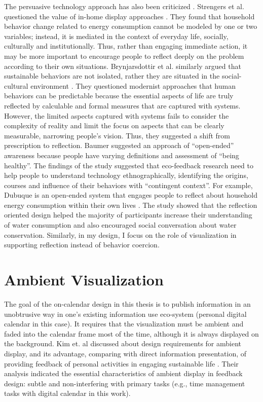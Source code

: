 \documentclass[12pt,oneside]{book}
\begin{document}
The persuasive technology approach has also been criticized \cite{brynjarsdottir_sustainably_2012, strengers_peak_2012,yetim_critical_2013}. Strengers et al. questioned the value of in-home display approaches \cite{strengers_peak_2012}.  They found that household behavior change related to energy consumption cannot be modeled by one or two variables; instead, it is mediated in the context of everyday life, socially, culturally and institutionally. Thus, rather than engaging immediate action, it may be more important to encourage people to reflect deeply on the problem according to their own situations.  Brynjarsdottir et al. similarly argued that sustainable behaviors are not isolated, rather they are situated in the social-cultural environment \cite{brynjarsdottir_sustainably_2012}.  They questioned modernist approaches that human behaviors can be predictable because the essential aspects of life are truly reflected by calculable and formal measures that are captured with systems.  However, the limited aspects captured with systems fails to consider the complexity of reality and limit the focus on aspects that can be clearly measurable, narrowing people's vision.  Thus, they suggested a shift from prescription to reflection.  Baumer \cite{baumer_prescriptive_2012} suggested an approach of ``open-ended'' awareness because people have varying definitions and assessment of ``being healthy''. The findings of the study \cite{strengers_designing_2011} suggested that eco-feedback research need to help people to understand technology ethnographically, identifying the origins, courses and influence of their behaviors with ``contingent context''.  For example, Dubuque is an open-ended system that engages people to reflect about household energy consumption within their own lives \cite{erickson_dubuque_2012}.  The study showed that the reflection oriented design helped the majority of participants increase their understanding of water consumption and also encouraged social conversation about water conservation.  Similarly, in my design, I focus on the role of visualization in supporting reflection instead of behavior coercion.

\section{Ambient Visualization}
\label{section:relatedWork:ambient visualization}
The goal of the on-calendar design in this thesis is to publish information in an unobtrusive way in one's existing information use eco-system (personal digital calendar in this case).  It requires that the visualization must be ambient and faded into the calendar frame most of the time, although it is always displayed on the background. Kim et. al discussed about design requirements for ambient display, and its advantage, comparing with direct information presentation, of providing feedback of personal activities in engaging sustainable life \cite{kim_designing_2010}.  Their analysis indicated the essential characteristics of ambient display in feedback design: subtle and non-interfering with primary tasks (e.g., time management tasks with digital calendar in this work).
\end{document}
